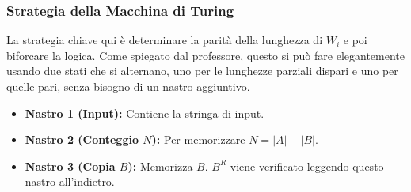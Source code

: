 \documentclass[a4paper]{article}
\begin{document}
\subsubsection{Strategia della Macchina di Turing}
La strategia chiave qui è determinare la parità della lunghezza di $W_i$ e poi biforcare la logica. Come spiegato dal professore, questo si può fare elegantemente usando due stati che si alternano, uno per le lunghezze parziali dispari e uno per quelle pari, senza bisogno di un nastro aggiuntivo.
\begin{itemize}
    \item \textbf{Nastro 1 (Input):} Contiene la stringa di input.
    \item \textbf{Nastro 2 (Conteggio $N$):} Per memorizzare $N = |A| - |B|$.
    \item \textbf{Nastro 3 (Copia $B$):} Memorizza $B$. $B^R$ viene verificato leggendo questo nastro all'indietro.
\end{itemize}
\end{document}
